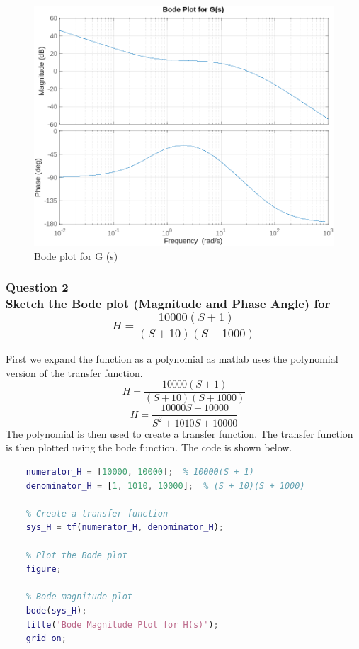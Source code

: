 \documentclass[a4paper,12pt]{article}
\begin{document}
\begin{figure}[H]
    \centering
    \includegraphics[width=\linewidth]{q1.png}
    \caption{Bode plot for G (s)}\label{fig:q1}
\end{figure}





\subsubsection*{Question 2\\Sketch the Bode plot (Magnitude and Phase Angle) for \[ H = \frac{10000(S + 1)} {(S + 10)(S + 1000)}\]} 

First we expand the function as a polynomial as matlab uses the polynomial version of the transfer function.
\[ H = \frac{10000(S + 1)} {(S + 10)(S + 1000)}\]
\[ H = \frac{10000S + 10000} {S^2 + 1010S + 10000}\]
The polynomial is then used to create a transfer function. The transfer function is then plotted using the bode function. The code is shown below.

\begin{lstlisting}[language=Matlab]
    % Define the transfer function
    numerator_H = [10000, 10000];  % 10000(S + 1)
    denominator_H = [1, 1010, 10000];  % (S + 10)(S + 1000)

    % Create a transfer function
    sys_H = tf(numerator_H, denominator_H);

    % Plot the Bode plot
    figure;

    % Bode magnitude plot
    bode(sys_H);
    title('Bode Magnitude Plot for H(s)');
    grid on;

\end{lstlisting}
\end{document}
